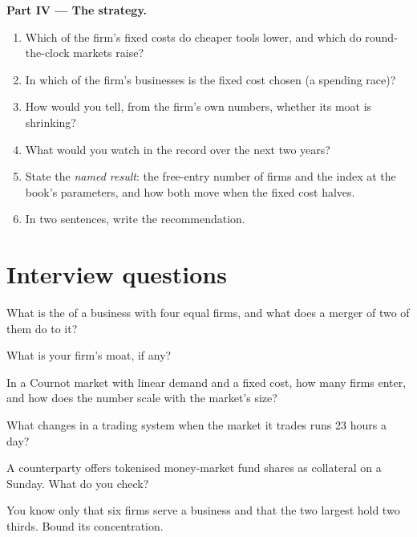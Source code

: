 \begin{problem}
\medskip\noindent\textbf{Part IV --- The strategy.}
\begin{enumerate}[resume]
\item Which of the firm's fixed costs do cheaper tools lower, and which do round-the-clock markets raise?
\item In which of the firm's businesses is the fixed cost chosen (a spending race)?
\item How would you tell, from the firm's own numbers, whether its moat is shrinking?
\item What would you watch in the record over the next two years?
\item State the \emph{named result}: the free-entry number of firms and the index at the book's parameters, and how both move when the fixed cost
halves.
\item In two sentences, write the recommendation.
\end{enumerate}
\end{problem}

\section{Interview questions}

\begin{interviewq}\label{iq:fm:competition-and-the-future:1}
What is the  of a business with four equal firms, and what does a merger of two of them do to it?
\end{interviewq}

\begin{interviewq}\label{iq:fm:competition-and-the-future:2}
What is your firm's moat, if any?
\end{interviewq}

\begin{interviewq}\label{iq:fm:competition-and-the-future:3}
In a Cournot market with linear demand and a fixed cost, how many firms enter, and how does the number scale with the market's size?
\end{interviewq}

\begin{interviewq}\label{iq:fm:competition-and-the-future:4}
What changes in a trading system when the market it trades runs 23 hours a day?
\end{interviewq}

\begin{interviewq}\label{iq:fm:competition-and-the-future:5}
A counterparty offers tokenised money-market fund shares as collateral on a Sunday. What do you check?
\end{interviewq}

\begin{interviewq}\label{iq:fm:competition-and-the-future:6}
You know only that six firms serve a business and that the two largest hold two thirds. Bound its concentration.
\end{interviewq}
